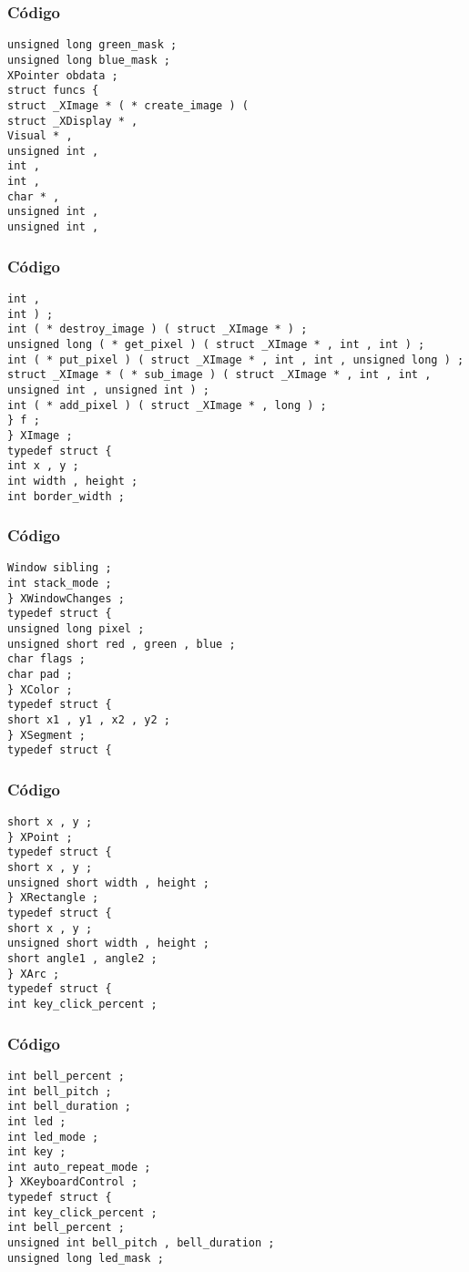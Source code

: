 \documentclass{beamer}
\begin{document}
\begin{frame}[fragile]
\frametitle{C\'odigo}
\begin{verbatim}
unsigned long green_mask ; 
unsigned long blue_mask ; 
XPointer obdata ; 
struct funcs { 
struct _XImage * ( * create_image ) ( 
struct _XDisplay * , 
Visual * , 
unsigned int , 
int , 
int , 
char * , 
unsigned int , 
unsigned int , 
\end{verbatim}
\end{frame}
\begin{frame}[fragile]
\frametitle{C\'odigo}
\begin{verbatim}
int , 
int ) ; 
int ( * destroy_image ) ( struct _XImage * ) ; 
unsigned long ( * get_pixel ) ( struct _XImage * , int , int ) ; 
int ( * put_pixel ) ( struct _XImage * , int , int , unsigned long ) ; 
struct _XImage * ( * sub_image ) ( struct _XImage * , int , int , unsigned int , unsigned int ) ; 
int ( * add_pixel ) ( struct _XImage * , long ) ; 
} f ; 
} XImage ; 
typedef struct { 
int x , y ; 
int width , height ; 
int border_width ; 
\end{verbatim}
\end{frame}
\begin{frame}[fragile]
\frametitle{C\'odigo}
\begin{verbatim}
Window sibling ; 
int stack_mode ; 
} XWindowChanges ; 
typedef struct { 
unsigned long pixel ; 
unsigned short red , green , blue ; 
char flags ; 
char pad ; 
} XColor ; 
typedef struct { 
short x1 , y1 , x2 , y2 ; 
} XSegment ; 
typedef struct { 
\end{verbatim}
\end{frame}
\begin{frame}[fragile]
\frametitle{C\'odigo}
\begin{verbatim}
short x , y ; 
} XPoint ; 
typedef struct { 
short x , y ; 
unsigned short width , height ; 
} XRectangle ; 
typedef struct { 
short x , y ; 
unsigned short width , height ; 
short angle1 , angle2 ; 
} XArc ; 
typedef struct { 
int key_click_percent ; 
\end{verbatim}
\end{frame}
\begin{frame}[fragile]
\frametitle{C\'odigo}
\begin{verbatim}
int bell_percent ; 
int bell_pitch ; 
int bell_duration ; 
int led ; 
int led_mode ; 
int key ; 
int auto_repeat_mode ; 
} XKeyboardControl ; 
typedef struct { 
int key_click_percent ; 
int bell_percent ; 
unsigned int bell_pitch , bell_duration ; 
unsigned long led_mask ; 
\end{verbatim}
\end{frame}
\end{document}
